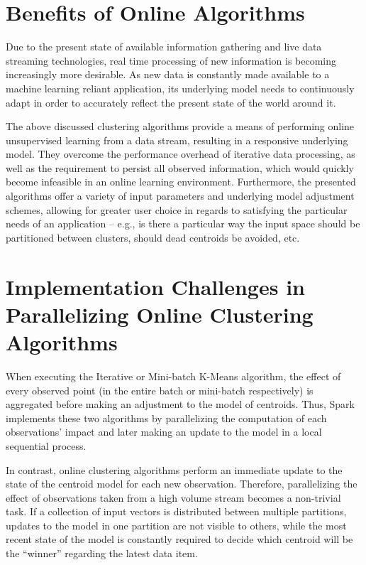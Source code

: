 \documentclass{l4proj}
\begin{document}
\section{Benefits of Online Algorithms}

Due to the present state of available information gathering and live data streaming technologies, real time processing of new information is becoming increasingly more desirable. As new data is constantly made available to a machine learning reliant application, its underlying model needs to continuously adapt in order to accurately reflect the present state of the world around it.

The above discussed clustering algorithms provide a means of performing online unsupervised learning from a data stream, resulting in a responsive underlying model. They overcome the performance overhead of iterative data processing, as well as the requirement to persist all observed information, which would quickly become infeasible in an online learning environment. Furthermore, the presented algorithms offer a variety of input parameters and underlying model adjustment schemes, allowing for greater user choice in regards to satisfying the particular needs of an application -- e.g., is there a particular way the input space should be partitioned between clusters, should dead centroids be avoided, etc. 

\section{Implementation Challenges in Parallelizing Online Clustering Algorithms}

When executing the Iterative or Mini-batch K-Means algorithm, the effect of every observed point (in the entire batch or mini-batch respectively) is aggregated before making an adjustment to the model of centroids. Thus, Spark implements these two algorithms by parallelizing the computation of each observations' impact and later making an update to the model in a local sequential process.

In contrast, online clustering algorithms perform an immediate update to the state of the centroid model for each new observation. Therefore, parallelizing the effect of observations taken from a high volume stream becomes a non-trivial task. If a collection of input vectors is distributed between multiple partitions, updates to the model in one partition are not visible to others, while the most recent state of the model is constantly required to decide which centroid will be the ``winner'' regarding the latest data item.
\end{document}

